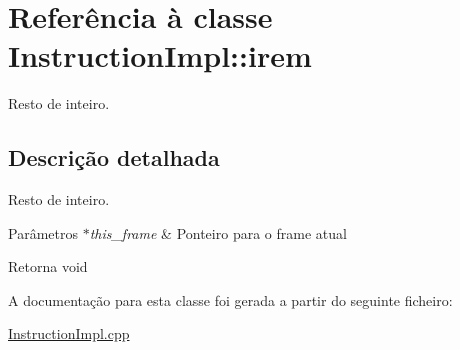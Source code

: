 \hypertarget{class_instruction_impl_1_1irem}{}\section{Referência à classe Instruction\+Impl\+:\+:irem}
\label{class_instruction_impl_1_1irem}


Resto de inteiro.  




\subsection{Descrição detalhada}
Resto de inteiro. 


\begin{DoxyParams}{Parâmetros}
{\em $\ast$this\+\_\+frame} & Ponteiro para o frame atual \\
\hline
\end{DoxyParams}
\begin{DoxyReturn}{Retorna}
void 
\end{DoxyReturn}


A documentação para esta classe foi gerada a partir do seguinte ficheiro\+:\begin{DoxyCompactItemize}
\item 
\hyperlink{_instruction_impl_8cpp}{Instruction\+Impl.\+cpp}\end{DoxyCompactItemize}
